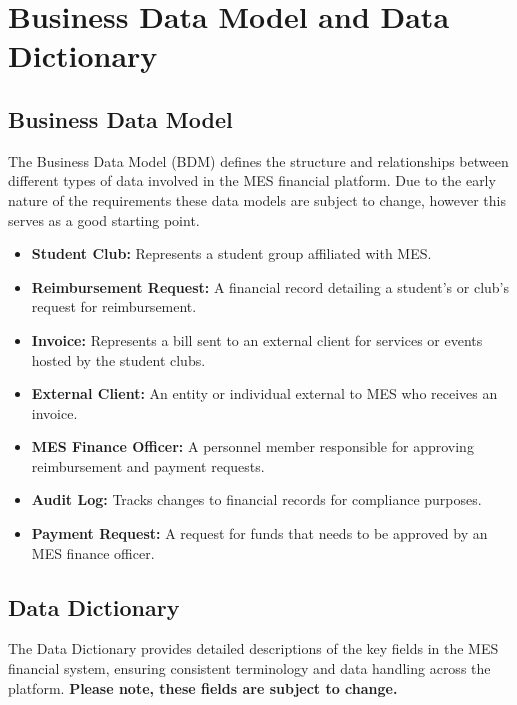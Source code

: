 \documentclass[12pt]{article}
\begin{document}
\section{Business Data Model and Data Dictionary}
\subsection{Business Data Model}
The Business Data Model (BDM) defines the structure and relationships between different types of data involved in the MES financial platform. Due to the early nature of the requirements these data models are subject to change, however this serves as a good starting point.

\begin{itemize}
    \item \textbf{Student Club:} Represents a student group affiliated with MES.
    \item \textbf{Reimbursement Request:} A financial record detailing a student's or club's request for reimbursement.
    \item \textbf{Invoice:} Represents a bill sent to an external client for services or events hosted by the student clubs.
    \item \textbf{External Client:} An entity or individual external to MES who receives an invoice.
    \item \textbf{MES Finance Officer:} A personnel member responsible for approving reimbursement and payment requests.
    \item \textbf{Audit Log:} Tracks changes to financial records for compliance purposes.
    \item \textbf{Payment Request:} A request for funds that needs to be approved by an MES finance officer.
\end{itemize}

\subsection{Data Dictionary}
The Data Dictionary provides detailed descriptions of the key fields in the MES financial system, ensuring consistent terminology and data handling across the platform. \textbf{Please note, these fields are subject to change.}
\end{document}
